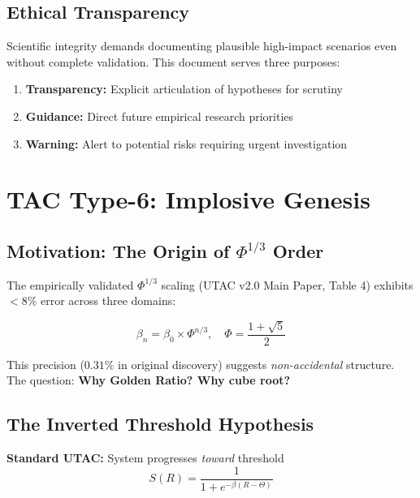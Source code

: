 \documentclass[11pt,a4paper]{article}
\begin{document}
\subsection{Ethical Transparency}

Scientific integrity demands documenting plausible high-impact scenarios even without complete validation. This document serves three purposes:

\begin{enumerate}
\item \textbf{Transparency:} Explicit articulation of hypotheses for scrutiny
\item \textbf{Guidance:} Direct future empirical research priorities
\item \textbf{Warning:} Alert to potential risks requiring urgent investigation
\end{enumerate}

\section{TAC Type-6: Implosive Genesis}

\subsection{Motivation: The Origin of $\Phi^{1/3}$ Order}

The empirically validated $\Phi^{1/3}$ scaling (UTAC v2.0 Main Paper, Table 4) exhibits $< 8\%$ error across three domains:

\begin{equation}
\beta_n = \beta_0 \times \Phi^{n/3}, \quad \Phi = \frac{1+\sqrt{5}}{2}
\end{equation}

This precision ($0.31\%$ in original discovery) suggests \textit{non-accidental} structure. The question: \textbf{Why Golden Ratio? Why cube root?}

\subsection{The Inverted Threshold Hypothesis}

\textbf{Standard UTAC:} System progresses \textit{toward} threshold
\begin{equation}
S(R) = \frac{1}{1 + e^{-\beta(R - \Theta)}}
\end{equation}
\end{document}
